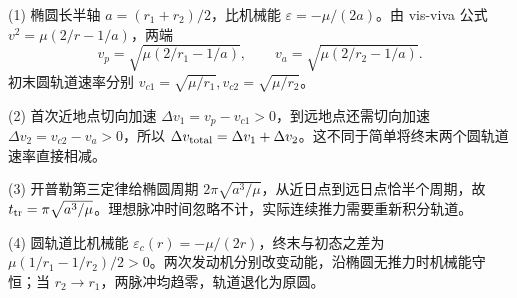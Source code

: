 (1) 椭圆长半轴 \(a=(r_1+r_2)/2\)，比机械能 \(\varepsilon=-\mu/(2a)\)。由 vis-viva 公式 \(v^2=\mu(2/r-1/a)\)，两端
\[
v_p=\sqrt{\mu(2/r_1-1/a)},\qquad v_a=\sqrt{\mu(2/r_2-1/a)}.
\]
初末圆轨道速率分别 \(v_{c1}=\sqrt{\mu/r_1},v_{c2}=\sqrt{\mu/r_2}\)。

(2) 首次近地点切向加速 \(\Delta v_1=v_p-v_{c1}>0\)，到远地点还需切向加速 \(\Delta v_2=v_{c2}-v_a>0\)，所以 \(\Delta v_{\rm total}=\Delta v_1+\Delta v_2\)。这不同于简单将终末两个圆轨道速率直接相减。

(3) 开普勒第三定律给椭圆周期 \(2\pi\sqrt{a^3/\mu}\)，从近日点到远日点恰半个周期，故 \(t_{\rm tr}=\pi\sqrt{a^3/\mu}\)。理想脉冲时间忽略不计，实际连续推力需要重新积分轨道。

(4) 圆轨道比机械能 \(\varepsilon_c(r)=-\mu/(2r)\)，终末与初态之差为 \(\mu(1/r_1-1/r_2)/2>0\)。两次发动机分别改变动能，沿椭圆无推力时机械能守恒；当 \(r_2\to r_1\)，两脉冲均趋零，轨道退化为原圆。
